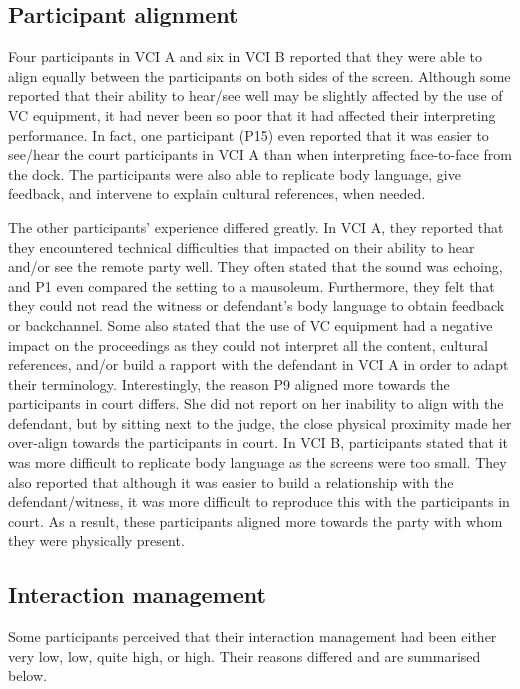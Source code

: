 \documentclass[output=paper]{langsci/langscibook}
\begin{document}
\subsection{Participant alignment}
Four participants in VCI A and six in VCI B reported that they were able to align equally between the participants on both sides of the screen. Although some reported that their ability to hear/see well may be slightly affected by the use of VC equipment, it had never been so poor that it had affected their interpreting performance. In fact, one participant (P15) even reported that it was easier to see/hear the court participants in VCI A than when interpreting face-to-face from the dock. The participants were also able to replicate body language, give feedback, and intervene to explain cultural references, when needed. 

The other participants’ experience differed greatly. In VCI A, they reported that they encountered technical difficulties that impacted on their ability to hear and/or see the remote party well. They often stated that the sound was echoing, and P1 even compared the setting to a mausoleum. Furthermore, they felt that they could not read the witness or defendant’s body language to obtain feedback or backchannel. Some also stated that the use of VC equipment had a negative impact on the proceedings as they could not interpret all the content, cultural references, and/or build a rapport with the defendant in VCI A in order to adapt their terminology. Interestingly, the reason P9 aligned more towards the participants in court differs. She did not report on her inability to align with the defendant, but by sitting next to the judge, the close physical proximity made her over-align towards the participants in court. In VCI B, participants stated that it was more difficult to replicate body language as the screens were too small. They also reported that although it was easier to build a relationship with the defendant/witness, it was more difficult to reproduce this with the participants in court. As a result, these participants aligned more towards the party with whom they were physically present. 

\subsection{Interaction management} 

Some participants perceived that their interaction management had been either very low, low, quite high, or high. Their reasons differed and are summarised below. 
\end{document}
